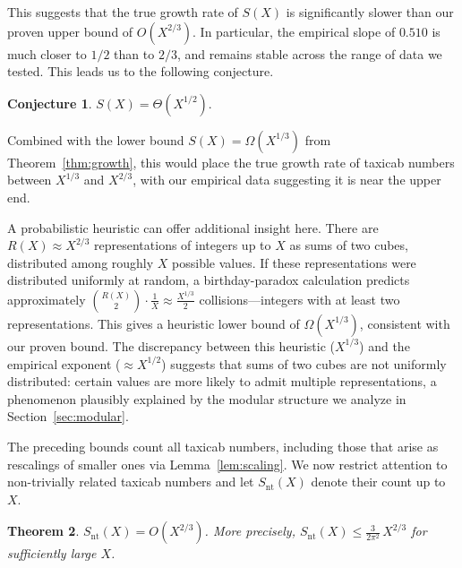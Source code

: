 \documentclass[12pt]{amsart}
\newtheorem{theorem}{Theorem}
\theoremstyle{definition}
\newtheorem{conjecture}[theorem]{Conjecture}
\theoremstyle{remark}
\begin{document}
This suggests that the true growth rate of $S(X)$ is significantly slower than our proven upper bound of $O(X^{2/3})$. In particular, the empirical slope of $0.510$ is much closer to $1/2$ than to $2/3$, and remains stable across the range of data we tested. This leads us to the following conjecture.

\begin{conjecture}\label{conj:density}
  $S(X) = \Theta(X^{1/2})$.
\end{conjecture}

Combined with the lower bound $S(X) = \Omega(X^{1/3})$ from Theorem~\ref{thm:growth}, this would place the true growth rate of taxicab numbers between $X^{1/3}$ and $X^{2/3}$, with our empirical data suggesting it is near the upper end.
\newline

A probabilistic heuristic can offer additional insight here. There are $R(X) \approx X^{2/3}$ representations of integers up to $X$ as sums of two cubes, distributed among roughly $X$ possible values. If these representations were distributed uniformly at random, a birthday-paradox calculation predicts approximately $\binom{R(X)}{2} \cdot \frac{1}{X} \approx \frac{X^{1/3}}{2}$ collisions---integers with at least two representations. This gives a heuristic lower bound of $\Omega(X^{1/3})$, consistent with our proven bound. The discrepancy between this heuristic ($X^{1/3}$) and the empirical exponent ($\approx X^{1/2}$) suggests that sums of two cubes are not uniformly distributed: certain values are more likely to admit multiple representations, a phenomenon plausibly explained by the modular structure we analyze in Section~\ref{sec:modular}.
\newline

The preceding bounds count all taxicab numbers, including those that arise as rescalings of smaller ones via Lemma~\ref{lem:scaling}. We now restrict attention to non-trivially related taxicab numbers and let $S_{\mathrm{nt}}(X)$ denote their count up to $X$.

\begin{theorem}\label{thm:nt-upper}
  $S_{\mathrm{nt}}(X) = O(X^{2/3})$. More precisely, $S_{\mathrm{nt}}(X) \le \frac{3}{2\pi^2}\, X^{2/3}$ for sufficiently large $X$.
\end{theorem}
\end{document}

